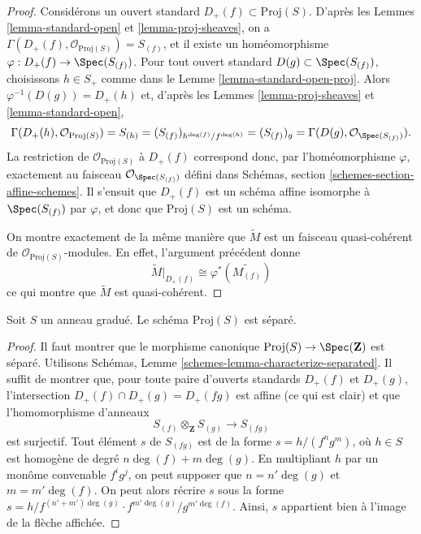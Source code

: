 \begin{proof}
Considérons un ouvert standard $D_{+}(f) \subset \text{Proj}(S)$.
D'après les Lemmes \ref{lemma-standard-open} et \ref{lemma-proj-sheaves},
on a $\Gamma(D_{+}(f), \mathcal{O}_{\text{Proj}(S)}) = S_{(f)}$, et il existe
un homéomorphisme $\varphi : D_{+}(f) \to \Spec(S_{(f)})$.
Pour tout ouvert standard $D(g) \subset \Spec(S_{(f)})$, choisissons
$h \in S_{+}$ comme dans le Lemme \ref{lemma-standard-open-proj}.
Alors $\varphi^{-1}(D(g)) = D_{+}(h)$ et, d'après les Lemmes
\ref{lemma-proj-sheaves} et \ref{lemma-standard-open},
$$
\Gamma(D_{+}(h), \mathcal{O}_{\text{Proj}(S)})
=
S_{(h)}
=
(S_{(f)})_{h^{\deg(f)}/f^{\deg(h)}}
=
(S_{(f)})_g
=
\Gamma(D(g), \mathcal{O}_{\Spec(S_{(f)})}).
$$
La restriction de $\mathcal{O}_{\text{Proj}(S)}$
à $D_{+}(f)$ correspond donc,
par l'homéomorphisme $\varphi$, exactement au faisceau
$\mathcal{O}_{\Spec(S_{(f)})}$ défini dans Schémas,
section \ref{schemes-section-affine-schemes}. Il s'ensuit que $D_{+}(f)$ est
un schéma affine isomorphe à $\Spec(S_{(f)})$ par $\varphi$, et donc que
$\text{Proj}(S)$ est un schéma.

\medskip\noindent
On montre exactement de la même manière que $\widetilde M$ est un faisceau
quasi-cohérent de $\mathcal{O}_{\text{Proj}(S)}$-modules. En effet, l'argument
précédent donne
$$
\widetilde M|_{D_{+}(f)} \cong \varphi^*\left(\widetilde{M_{(f)}}\right)
$$
ce qui montre que $\widetilde M$ est quasi-cohérent.
\end{proof}

\begin{lemma}
\label{lemma-proj-separated}
Soit $S$ un anneau gradué. Le
schéma $\text{Proj}(S)$ est séparé.
\end{lemma}

\begin{proof}
Il faut montrer que le morphisme canonique
$\text{Proj}(S) \to \Spec(\mathbf{Z})$ est séparé. Utilisons Schémas,
Lemme \ref{schemes-lemma-characterize-separated}. Il suffit de montrer que,
pour toute paire d'ouverts standards $D_{+}(f)$ et $D_{+}(g)$,
l'intersection $D_{+}(f) \cap D_{+}(g) = D_{+}(fg)$ est affine (ce qui est
clair) et que l'homomorphisme d'anneaux
$$
S_{(f)} \otimes_{\mathbf{Z}} S_{(g)} \longrightarrow S_{(fg)}
$$
est surjectif. Tout élément $s$ de $S_{(fg)}$ est de la forme
$s = h/(f^ng^m)$, où $h \in S$ est homogène de degré
$n\deg(f) + m\deg(g)$. En multipliant $h$ par un monôme convenable
$f^ig^j$, on peut supposer que $n = n' \deg(g)$ et
$m = m' \deg(f)$. On peut alors récrire $s$ sous la forme
$s = h/f^{(n' + m')\deg(g)} \cdot f^{m'\deg(g)}/g^{m'\deg(f)}$.
Ainsi, $s$ appartient bien à l'image de la
flèche affichée.
\end{proof}

